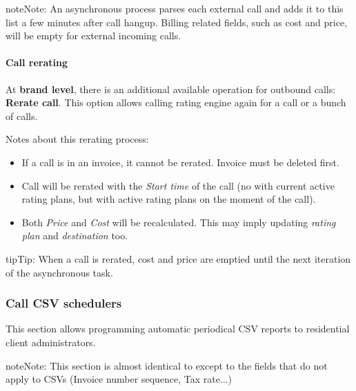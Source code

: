 \documentclass[letterpaper,10pt,english]{sphinxmanual}
\begin{document}
\begin{notice}{note}{Note:}
An asynchronous process parses each external call and adds it to this list a few minutes after call hangup. Billing related fields, such as cost and price, will be empty for external incoming calls.
\end{notice}


\paragraph{Call rerating}
\label{administration_portal/client/residential/calls/external_calls:call-rerating}
At \textbf{brand level}, there is an additional available operation for outbound calls: \textbf{Rerate call}. This option allows calling rating engine again for a call or a bunch of calls.

Notes about this rerating process:
\begin{itemize}
\item {} 
If a call is in an invoice, it cannot be rerated. Invoice must be deleted first.

\item {} 
Call will be rerated with the \emph{Start time} of the call (no with current active rating plans, but with active rating plans
on the moment of the call).

\item {} 
Both \emph{Price} and \emph{Cost} will be recalculated. This may imply updating \emph{rating plan} and \emph{destination} too.

\end{itemize}

\begin{notice}{tip}{Tip:}
When a call is rerated, cost and price are emptied until the next iteration of the asynchronous task.
\end{notice}


\subsubsection{Call CSV schedulers}
\label{administration_portal/client/residential/calls/call_csv_schedulers:call-csv-schedulers}\label{administration_portal/client/residential/calls/call_csv_schedulers::doc}
This section allows programming automatic periodical CSV reports to residential client administrators.

\begin{notice}{note}{Note:}
This section is almost identical to {\hyperref[administration_portal/brand/invoicing/invoice_schedulers:invoice\string-schedulers]{}} except to the
fields that do not apply to CSVs (Invoice number sequence, Tax rate...)
\end{notice}
\end{document}
